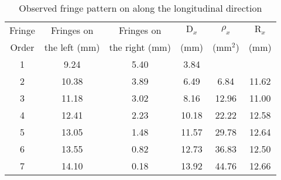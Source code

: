 \begin{table}[H]
    \centering
    \begin{tabular}{|c|c|c|c|c|c|}
        \hline
        Fringe    & Fringes on     & Fringes on       & $\text{D}_x$        & $\rho_x$   & $\text{R}_x$    \\ 
        Order     & the left (mm)  & the right (mm)   & (mm)       & ($\text{mm}^2$)   & (mm)   \\ \hline
        1 &  9.24 & 5.40 &  3.84 &     &     \\
         2 & 10.38 & 3.89 &  6.49 &  6.84 & 11.62 \\
         3 & 11.18 & 3.02 &  8.16 & 12.96 & 11.00  \\
         4 & 12.41 & 2.23 & 10.18 & 22.22 & 12.58 \\
         5 & 13.05 & 1.48 & 11.57 & 29.78 & 12.64 \\
         6 & 13.55 & 0.82 & 12.73 & 36.83 & 12.50 \\
         7 & 14.10 & 0.18 & 13.92 & 44.76 & 12.66 \\\hline
       \end{tabular}
    \caption{Observed fringe pattern on along the longitudinal direction}
    \label{tab:3}
\end{table}